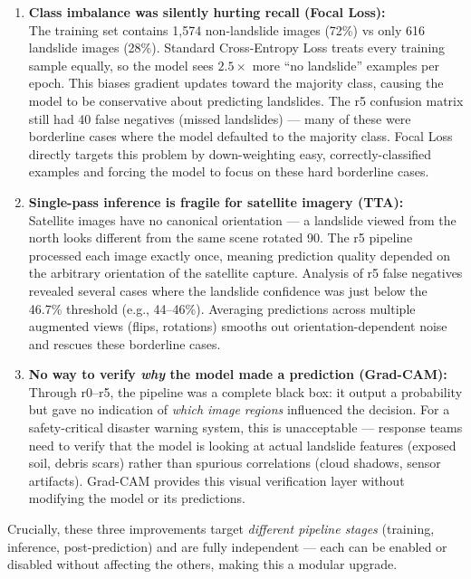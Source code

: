 \documentclass[11pt]{article}
\begin{document}
\begin{enumerate}
    \item \textbf{Class imbalance was silently hurting recall (Focal Loss):}\\
          The training set contains 1,574 non-landslide images (72\%) vs only 616 landslide images (28\%). Standard Cross-Entropy Loss treats every training sample equally, so the model sees $2.5\times$ more ``no landslide'' examples per epoch. This biases gradient updates toward the majority class, causing the model to be conservative about predicting landslides. The r5 confusion matrix still had 40 false negatives (missed landslides) --- many of these were borderline cases where the model defaulted to the majority class. Focal Loss directly targets this problem by down-weighting easy, correctly-classified examples and forcing the model to focus on these hard borderline cases.

    \item \textbf{Single-pass inference is fragile for satellite imagery (TTA):}\\
          Satellite images have no canonical orientation --- a landslide viewed from the north looks different from the same scene rotated 90\textdegree. The r5 pipeline processed each image exactly once, meaning prediction quality depended on the arbitrary orientation of the satellite capture. Analysis of r5 false negatives revealed several cases where the landslide confidence was just below the 46.7\% threshold (e.g., 44--46\%). Averaging predictions across multiple augmented views (flips, rotations) smooths out orientation-dependent noise and rescues these borderline cases.

    \item \textbf{No way to verify \textit{why} the model made a prediction (Grad-CAM):}\\
          Through r0--r5, the pipeline was a complete black box: it output a probability but gave no indication of \textit{which image regions} influenced the decision. For a safety-critical disaster warning system, this is unacceptable --- response teams need to verify that the model is looking at actual landslide features (exposed soil, debris scars) rather than spurious correlations (cloud shadows, sensor artifacts). Grad-CAM provides this visual verification layer without modifying the model or its predictions.
\end{enumerate}

\noindent Crucially, these three improvements target \textit{different pipeline stages} (training, inference, post-prediction) and are fully independent --- each can be enabled or disabled without affecting the others, making this a modular upgrade.
\end{document}
